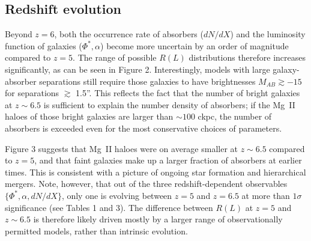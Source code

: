 \documentclass[useAMS,usenatbib]{mn2e}
\newcommand{\magtwo}{Mg~{\small II} }
\begin{document}
\subsection{Redshift evolution}

Beyond $z=6$, both the occurrence rate of absorbers ($dN/dX$) and the luminosity function of galaxies ($\Phi^*, \alpha$) become more uncertain by an order of magnitude compared to $z=5$. The range of possible $R(L)$ distributions therefore increases significantly, as can be seen in Figure 2. Interestingly, models with large galaxy-absorber separations still require those galaxies to have brightnesses $M_{AB} \gtrsim -15$ for separations $\gtrsim$ 1.5''. This reflects the fact that the number of bright galaxies at $z\sim 6.5$ is sufficient to explain the number density of absorbers; if the \magtwo haloes of those bright galaxies are larger than $\sim 100$ ckpc, the number of absorbers is exceeded even for the most conservative choices of parameters.

Figure 3 suggests that \magtwo haloes were on average smaller at $z\sim6.5$ compared to $z=5$, and that faint galaxies make up a larger fraction of absorbers at earlier times. This is consistent with a picture of ongoing star formation and hierarchical mergers. Note, however, that out of the three redshift-dependent observables $\{\Phi^*,\alpha, dN/dX\}$, only one is evolving between $z=5$ and $z=6.5$ at more than $1 \sigma$ significance (see Tables 1 and 3). The difference between $R(L)$ at $z=5$ and $z\sim6.5$ is therefore likely driven mostly by a larger range of observationally permitted models, rather than intrinsic evolution.



 
\end{document}
